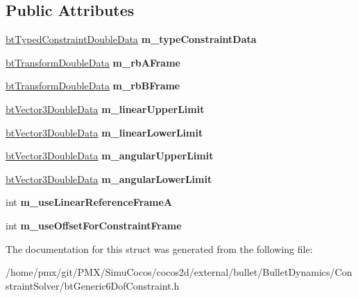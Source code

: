 \subsection*{Public Attributes}
\begin{DoxyCompactItemize}
\item 
\mbox{\label{structbtGeneric6DofConstraintDoubleData2_a2c3bc05b720fd0e5fde03bbca3813316}} 
\hyperlink{structbtTypedConstraintDoubleData}{bt\+Typed\+Constraint\+Double\+Data} {\bfseries m\+\_\+type\+Constraint\+Data}
\item 
\mbox{\label{structbtGeneric6DofConstraintDoubleData2_a4302fd9a60855c7f8eb6ec71319f1219}} 
\hyperlink{structbtTransformDoubleData}{bt\+Transform\+Double\+Data} {\bfseries m\+\_\+rb\+A\+Frame}
\item 
\mbox{\label{structbtGeneric6DofConstraintDoubleData2_aaae9eec42be5044c4bebfadf62554661}} 
\hyperlink{structbtTransformDoubleData}{bt\+Transform\+Double\+Data} {\bfseries m\+\_\+rb\+B\+Frame}
\item 
\mbox{\label{structbtGeneric6DofConstraintDoubleData2_a05d9876c5a7efcadcb8124a3e9f4c17e}} 
\hyperlink{structbtVector3DoubleData}{bt\+Vector3\+Double\+Data} {\bfseries m\+\_\+linear\+Upper\+Limit}
\item 
\mbox{\label{structbtGeneric6DofConstraintDoubleData2_a43b141129be34272dae0a3ca2d9ed629}} 
\hyperlink{structbtVector3DoubleData}{bt\+Vector3\+Double\+Data} {\bfseries m\+\_\+linear\+Lower\+Limit}
\item 
\mbox{\label{structbtGeneric6DofConstraintDoubleData2_a94b1f3410314bf81b54acda688c7b7fa}} 
\hyperlink{structbtVector3DoubleData}{bt\+Vector3\+Double\+Data} {\bfseries m\+\_\+angular\+Upper\+Limit}
\item 
\mbox{\label{structbtGeneric6DofConstraintDoubleData2_a185c18b1abf0d8eee7c7493f15f9b66d}} 
\hyperlink{structbtVector3DoubleData}{bt\+Vector3\+Double\+Data} {\bfseries m\+\_\+angular\+Lower\+Limit}
\item 
\mbox{\label{structbtGeneric6DofConstraintDoubleData2_afbcfc0639b3608350b6deebeca3df638}} 
int {\bfseries m\+\_\+use\+Linear\+Reference\+FrameA}
\item 
\mbox{\label{structbtGeneric6DofConstraintDoubleData2_a1fcc15b006fefb696bb8165f2caa083d}} 
int {\bfseries m\+\_\+use\+Offset\+For\+Constraint\+Frame}
\end{DoxyCompactItemize}


The documentation for this struct was generated from the following file\+:\begin{DoxyCompactItemize}
\item 
/home/pmx/git/\+P\+M\+X/\+Simu\+Cocos/cocos2d/external/bullet/\+Bullet\+Dynamics/\+Constraint\+Solver/bt\+Generic6\+Dof\+Constraint.\+h\end{DoxyCompactItemize}
